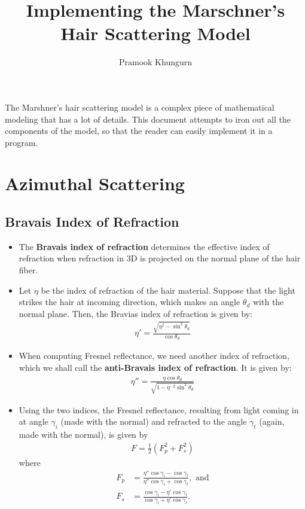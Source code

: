 \documentclass[10pt]{article}
\title{Implementing the Marschner's Hair Scattering Model}
\author{Pramook Khungurn}
\begin{document}
	\maketitle

  The Marshner's hair scattering model \cite{Marschner:2003} 
  is a complex piece of 
  mathematical modeling that has a lot of details.
  This document attempts to iron out all the components of 
  the model, so that the reader can easily implement it
  in a program.
  
  \section{Azimuthal Scattering}
  
  \subsection{Bravais Index of Refraction}
  
  \begin{itemize}
    \item The {\bf Bravais index of refraction} determines the
      effective index of refraction when refraction in
      3D is projected on the normal plane of the hair fiber.
      
    \item Let $\eta$ be the index of refraction of the hair
      material. Suppose that the light strikes the hair at 
      incoming direction, which makes an angle
      $\theta_d$ with the normal plane.
      Then, the Bravias index of refraction 
      is given by:
      \begin{align*}
        \eta' = \frac{\sqrt{\eta^2 - \sin^2 \theta_d}}{\cos \theta_d}
      \end{align*}
      
    \item When computing Fresnel reflectance, we need another
      index of refraction, which we shall call the 
      {\bf anti-Bravais index of refraction}. It is given by:
      \begin{align*}
        \eta'' = \frac{\eta \cos \theta_d}{\sqrt{1 - \eta^{-2} \sin^2 \theta_d}}
      \end{align*}
    
    \item Using the two indices, the Fresnel reflectance, resulting
      from light coming in at angle $\gamma_i$ (made with the normal)
      and refracted to the angle $\gamma_t$ (again, made with the 
      normal), is given by
      \begin{align*} 
        F = \frac{1}{2}(F_p^2 + F_s^2)      
      \end{align*}
      where
      \begin{align*}
        F_p &= \frac{\eta'' \cos \gamma_i - \cos \gamma_t}{\eta'' \cos \gamma_i + \cos \gamma_t}, \mbox{ and}\\
        F_s &= \frac{\cos \gamma_i - \eta' \cos \gamma_t}{\cos \gamma_i + \eta' \cos \gamma_t}.
      \end{align*}
  \end{itemize}
  
\end{document}
